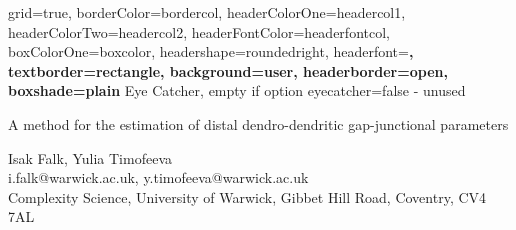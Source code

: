 \documentclass[a0paper,portrait]{baposter}
\begin{document}
\begin{poster}{
	grid=true,
	borderColor=bordercol,
	headerColorOne=headercol1,
	headerColorTwo=headercol2,
	headerFontColor=headerfontcol,
	boxColorOne=boxcolor,
	headershape=roundedright,
	headerfont=\Large\sf\bf,
	textborder=rectangle,
	background=user,
	headerborder=open,
  boxshade=plain
}
{
	Eye Catcher, empty if option eyecatcher=false - unused
}
{\sf\bf
	\begin{huge}
		A method for the estimation of distal dendro-dendritic gap-junctional parameters
	\end{huge}
}
{
	\vspace{0.5em} Isak Falk, Yulia Timofeeva\\
	{\smaller i.falk@warwick.ac.uk, y.timofeeva@warwick.ac.uk} \\
	{\smaller Complexity Science, University of Warwick, Gibbet Hill Road, Coventry, CV4 7AL} 
}
{
\setlength\fboxsep{0pt}
\setlength\fboxrule{0.5pt}
}


\end{poster}
\end{document}
